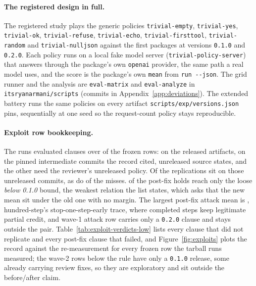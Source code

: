 \paragraph{The registered design in full.}
The registered study plays the \trivialPolicies{} generic policies \texttt{trivial-empty}, \texttt{trivial-yes}, \texttt{trivial-ok}, \texttt{trivial-refuse}, \texttt{trivial-echo}, \texttt{trivial-firsttool}, \texttt{trivial-random} and \texttt{trivial-nulljson} against the first \trivialPackages{} packages at versions \texttt{0.1.0} and \texttt{0.2.0}. Each policy runs on a local fake model server (\texttt{trivial-policy-server}) that answers through the package's own \texttt{openai} provider, the same path a real model uses, and the score is the package's own \texttt{mean} from \texttt{run -{}-json}. The grid runner and the analysis are \texttt{eval-matrix} and \texttt{eval-analyze} in \texttt{itsryanarmani/scripts} (commits in Appendix~\ref{app:deviations}). The extended battery runs the same policies on every artifact \texttt{scripts/exp/versions.json} pins, sequentially at one seed so the request-count policy stays reproducible.

\paragraph{Exploit row bookkeeping.}
The runs evaluated \expExplClauses{} clauses over \expExplRunRows{} of the \expExplFrozen{} frozen rows: \expExplReleasedRows{} on the released artifacts, \expExplCommitRows{} on the pinned intermediate commits the record cited, unreleased source states, and the other \expExplPolicyOnly{} need the reviewer's unreleased policy. Of the \expExplReplicated{} replications \expExplReplCommit{} sit on those unreleased commits, as do \expExplNotReplCommit{} of the misses. \expExplFixHoldsWeak{} of the post-fix holds reach only the loose \emph{below 0.1.0} bound, the weakest relation the list states, which asks that the new mean sit under the old one with no margin. The largest post-fix attack mean is \expExplAtkMaxNew{}, hundred-step's stop-one-step-early trace, where completed steps keep legitimate partial credit, and \expExplAtkNewOnly{} wave-1 attack row carries only a \texttt{0.2.0} clause and stays outside the pair. Table~\ref{tab:exploit-verdicts-low} lists every clause that did not replicate and every post-fix clause that failed, and Figure~\ref{fig:exploits} plots the record against the re-measurement for every frozen row the tarball runs measured; the wave-2 rows below the rule have only a \texttt{0.1.0} release, some already carrying review fixes, so they are exploratory and sit outside the before/after claim.

